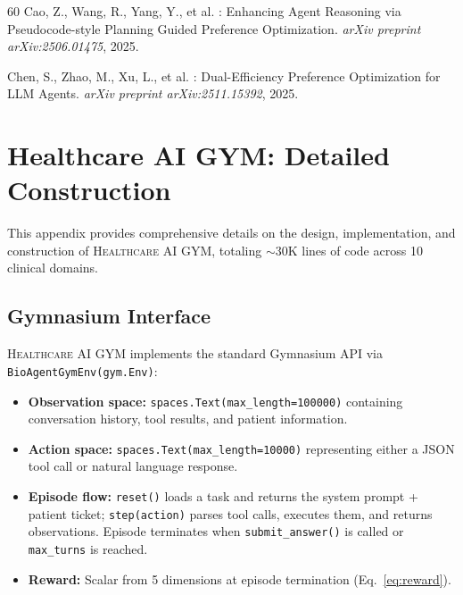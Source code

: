 \documentclass{article}
\newcommand{\gym}{\textsc{Healthcare AI GYM}}
\begin{document}
\begin{thebibliography}{60}
Cao, Z., Wang, R., Yang, Y., et al.
: Enhancing Agent Reasoning via Pseudocode-style Planning Guided Preference Optimization.
\newblock \emph{arXiv preprint arXiv:2506.01475}, 2025.

Chen, S., Zhao, M., Xu, L., et al.
: Dual-Efficiency Preference Optimization for {LLM} Agents.
\newblock \emph{arXiv preprint arXiv:2511.15392}, 2025.

\end{thebibliography}

\appendix

\section{Healthcare AI GYM: Detailed Construction}
\label{Appendix:AI_healthcare_gym}

This appendix provides comprehensive details on the design, implementation, and construction of \gym{}, totaling $\sim$30K lines of code across 10 clinical domains.

\subsection{Gymnasium Interface}

\gym{} implements the standard Gymnasium API via \texttt{BioAgentGymEnv(gym.Env)}:

\begin{itemize}[leftmargin=*,itemsep=1pt]
    \item \textbf{Observation space:} \texttt{spaces.Text(max\_length=100000)} containing conversation history, tool results, and patient information.
    \item \textbf{Action space:} \texttt{spaces.Text(max\_length=10000)} representing either a JSON tool call or natural language response.
    \item \textbf{Episode flow:} \texttt{reset()} loads a task and returns the system prompt + patient ticket; \texttt{step(action)} parses tool calls, executes them, and returns observations. Episode terminates when \texttt{submit\_answer()} is called or \texttt{max\_turns} is reached.
    \item \textbf{Reward:} Scalar from 5 dimensions at episode termination (Eq.~\ref{eq:reward}).
\end{itemize}
\end{document}
